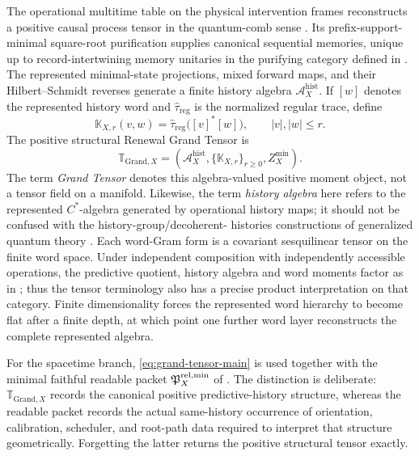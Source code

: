 \documentclass[11pt]{article}
\numberwithin{equation}{section}
\theoremstyle{definition}
\theoremstyle{remark}
\newcommand{\Grand}{\mathrm{Grand}}
\newcommand{\GTX}{\boldsymbol{\mathbb T}_{\Grand,X}}
\begin{document}
The operational multitime table on the physical intervention frames
reconstructs a positive causal process tensor in the quantum-comb sense
\cite{Chiribella2009,Pollock2018}.  Its prefix-support-minimal square-root
purification supplies canonical sequential memories, unique up to
record-intertwining memory unitaries in the purifying category defined in
.  The represented minimal-state projections,
mixed forward maps, and their Hilbert--Schmidt reverses generate a finite
history algebra $\mathcal A_X^{\mathrm{hist}}$.  If $[w]$ denotes the
represented history word and $\widehat\tau_{\mathrm{reg}}$ is the normalized
regular trace, define
\begin{equation}
 \mathbb K_{X,r}(v,w)
 =\widehat\tau_{\mathrm{reg}}\bigl([v]^*[w]\bigr),
 \qquad |v|,|w|\le r.
 \label{eq:word-gram-main}
\end{equation}
The positive structural Renewal Grand Tensor is
\begin{equation}
 \boxed{
 \GTX
 =\left(
 \mathcal A_X^{\mathrm{hist}},
 \{\mathbb K_{X,r}\}_{r\ge0},
 Z_X^{\min}
 \right).}
 \label{eq:grand-tensor-main}
\end{equation}
The term \emph{Grand Tensor} denotes this algebra-valued positive moment
object, not a tensor field on a manifold.  Likewise, the term \emph{history
algebra} here refers to the represented $C^*$-algebra generated by operational
history maps; it should not be confused with the history-group/decoherent-
histories constructions of generalized quantum theory
\cite{IshamLinden1995}. Each word-Gram form is a covariant
sesquilinear tensor on the finite word space. Under independent composition
with independently accessible operations, the predictive quotient, history
algebra and word moments factor as in
; thus the tensor terminology also has a
precise product interpretation on that category.  Finite dimensionality forces the represented word hierarchy to
become flat after a finite depth, at which point one further word layer
reconstructs the complete represented algebra.

For the spacetime branch, \eqref{eq:grand-tensor-main} is used together with
the minimal faithful readable packet $\mathfrak P_X^{\rm rel,min}$ of
.  The distinction is deliberate:
$\GTX$ records the canonical positive predictive-history structure, whereas
the readable packet records the actual same-history occurrence of orientation,
calibration, scheduler, and root-path data required to interpret that
structure geometrically.  Forgetting the latter returns the positive
structural tensor exactly.
\end{document}
